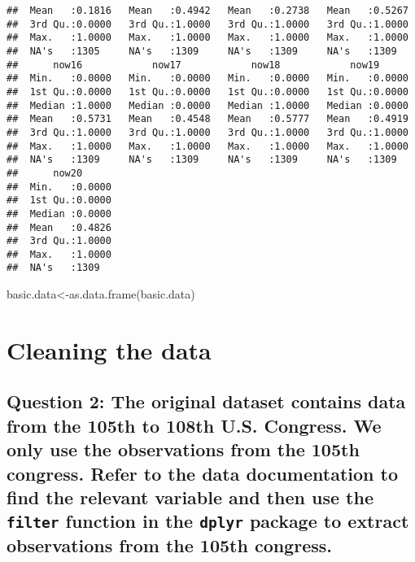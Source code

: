 \documentclass[
]{article}
\newenvironment{Shaded}{\begin{snugshade}}{\end{snugshade}}
\newcommand{\FunctionTok}[1]{\textcolor[rgb]{0.00,0.00,0.00}{#1}}
\newcommand{\NormalTok}[1]{#1}
\newcommand{\OtherTok}[1]{\textcolor[rgb]{0.56,0.35,0.01}{#1}}
\begin{document}
\begin{verbatim}
##  Mean   :0.1816   Mean   :0.4942   Mean   :0.2738   Mean   :0.5267  
##  3rd Qu.:0.0000   3rd Qu.:1.0000   3rd Qu.:1.0000   3rd Qu.:1.0000  
##  Max.   :1.0000   Max.   :1.0000   Max.   :1.0000   Max.   :1.0000  
##  NA's   :1305     NA's   :1309     NA's   :1309     NA's   :1309    
##      now16            now17            now18            now19       
##  Min.   :0.0000   Min.   :0.0000   Min.   :0.0000   Min.   :0.0000  
##  1st Qu.:0.0000   1st Qu.:0.0000   1st Qu.:0.0000   1st Qu.:0.0000  
##  Median :1.0000   Median :0.0000   Median :1.0000   Median :0.0000  
##  Mean   :0.5731   Mean   :0.4548   Mean   :0.5777   Mean   :0.4919  
##  3rd Qu.:1.0000   3rd Qu.:1.0000   3rd Qu.:1.0000   3rd Qu.:1.0000  
##  Max.   :1.0000   Max.   :1.0000   Max.   :1.0000   Max.   :1.0000  
##  NA's   :1309     NA's   :1309     NA's   :1309     NA's   :1309    
##      now20       
##  Min.   :0.0000  
##  1st Qu.:0.0000  
##  Median :0.0000  
##  Mean   :0.4826  
##  3rd Qu.:1.0000  
##  Max.   :1.0000  
##  NA's   :1309
\end{verbatim}

\begin{Shaded}
\begin{Highlighting}[]
\NormalTok{basic.data}\OtherTok{\textless{}{-}}\FunctionTok{as.data.frame}\NormalTok{(basic.data)}
\end{Highlighting}
\end{Shaded}

\hypertarget{cleaning-the-data}{%
\section{Cleaning the data}\label{cleaning-the-data}}

\hypertarget{question-2-the-original-dataset-contains-data-from-the-105th-to-108th-u.s.-congress.-we-only-use-the-observations-from-the-105th-congress.-refer-to-the-data-documentation-to-find-the-relevant-variable-and-then-use-the-filter-function-in-the-dplyr-package-to-extract-observations-from-the-105th-congress.}{%
\subsection{\texorpdfstring{Question 2: The original dataset contains
data from the 105th to 108th U.S. Congress. We only use the observations
from the 105th congress. Refer to the data documentation to find the
relevant variable and then use the \texttt{filter} function in the
\texttt{dplyr} package to extract observations from the 105th
congress.}{Question 2: The original dataset contains data from the 105th to 108th U.S. Congress. We only use the observations from the 105th congress. Refer to the data documentation to find the relevant variable and then use the filter function in the dplyr package to extract observations from the 105th congress.}}\label{question-2-the-original-dataset-contains-data-from-the-105th-to-108th-u.s.-congress.-we-only-use-the-observations-from-the-105th-congress.-refer-to-the-data-documentation-to-find-the-relevant-variable-and-then-use-the-filter-function-in-the-dplyr-package-to-extract-observations-from-the-105th-congress.}}
\end{document}
